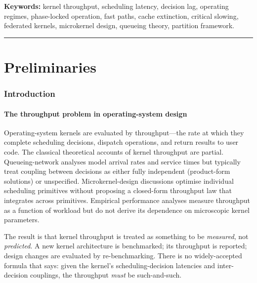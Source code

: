 \documentclass[twocolumn,11pt,a4paper]{article}
\begin{document}
\noindent\textbf{Keywords:} kernel throughput, scheduling latency, decision lag, operating regimes, phase-locked operation, fast paths, cache extinction, critical slowing, federated kernels, microkernel design, queueing theory, partition framework.

\tableofcontents

\vspace{6pt}
\hrule
\vspace{6pt}

\part{Preliminaries}

\section{Introduction}
\label{sec:intro}

\subsection{The throughput problem in operating-system design}

Operating-system kernels are evaluated by throughput---the rate at which they complete scheduling decisions, dispatch operations, and return results to user code. The classical theoretical accounts of kernel throughput are partial. Queueing-network analyses \citep{kleinrock1975,jackson1957,baskett1975} model arrival rates and service times but typically treat coupling between decisions as either fully independent (product-form solutions) or unspecified. Microkernel-design discussions \citep{liedtke1995microkernel,klein2009sel4,tanenbaum2014modern} optimise individual scheduling primitives without proposing a closed-form throughput law that integrates across primitives. Empirical performance analyses \citep{jain1991art,patterson2017computer} measure throughput as a function of workload but do not derive its dependence on microscopic kernel parameters.

The result is that kernel throughput is treated as something to be \emph{measured}, not \emph{predicted}. A new kernel architecture is benchmarked; its throughput is reported; design changes are evaluated by re-benchmarking. There is no widely-accepted formula that says: given the kernel's scheduling-decision latencies and inter-decision couplings, the throughput \emph{must} be such-and-such.
\end{document}
